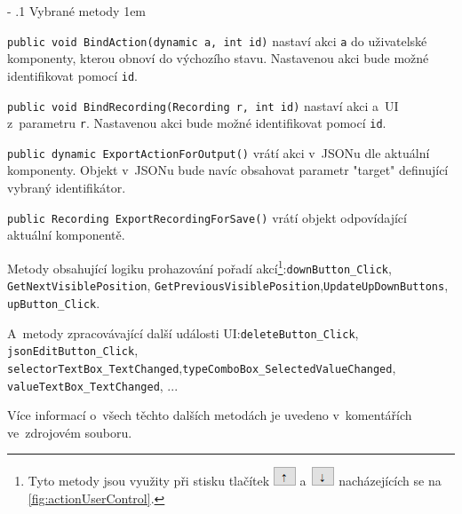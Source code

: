 \documentclass[12pt, a4paper, twoside]{article}
\makeatletter
\newenvironment{methods}{
	\parindent0pt
	\parskip1em
	\vspace{-0.8em}
}{}
\renewcommand\paragraph{%
	\@startsection{subparagraph}{5}{0mm}%
	{-\baselineskip}%
	{.1\baselineskip}%
	{\normalfont\normalsize\bfseries}}
\makeatother
\begin{document}
	\paragraph{Vybrané metody}
	\begin{methods}
		\lstinline[style=MyCSharpDocs]|public void BindAction(dynamic a, int id)| nastaví akci \lstinline|a| do uživatelské komponenty, kterou obnoví do výchozího stavu. Nastavenou akci bude možné identifikovat pomocí \lstinline|id|.
		
		\lstinline[style=MyCSharpDocs]|public void BindRecording(Recording r, int id)| nastaví akci a~UI z~parametru \lstinline|r|. Nastavenou akci bude možné identifikovat pomocí \lstinline|id|.
		
		\lstinline[style=MyCSharpDocs]|public dynamic ExportActionForOutput()| vrátí akci v~JSONu dle aktuální komponenty. Objekt v~JSONu bude navíc obsahovat parametr "target" definující vybraný identifikátor.
		
		\lstinline[style=MyCSharpDocs]|public Recording ExportRecordingForSave()| vrátí objekt odpovídající aktuální komponentě.
		
		Metody obsahující logiku prohazování pořadí akcí\footnote{Tyto metody jsou využity při stisku tlačítek \includegraphics{upArrow.png} a~\includegraphics{downArrow.png} nacházejících se na \cref{fig:actionUserControl}.}:\newline\lstinline|downButton_Click|, \lstinline|GetNextVisiblePosition|, \lstinline|GetPreviousVisiblePosition|,\linebreak\lstinline|UpdateUpDownButtons|, \lstinline|upButton_Click|.
		
		A~metody zpracovávající další události UI:\newline \lstinline|deleteButton_Click|, \lstinline|jsonEditButton_Click|, \lstinline|selectorTextBox_TextChanged|,\linebreak \lstinline|typeComboBox_SelectedValueChanged|, \lstinline|valueTextBox_TextChanged|, ...
		
		Více informací o~všech těchto dalších metodách je uvedeno v~komentářích ve~zdrojovém souboru.
		
		
	\end{methods}
	
\end{document}
